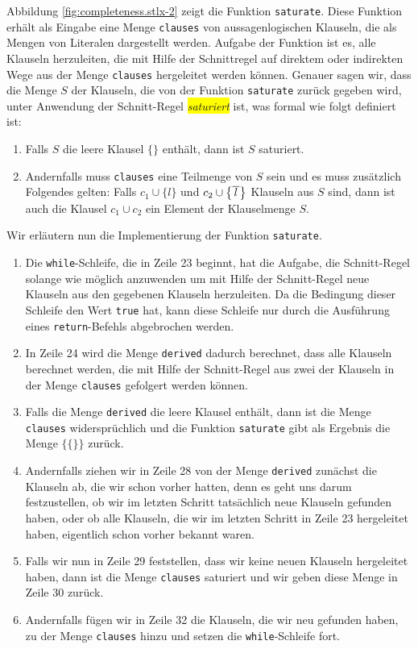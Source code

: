 Abbildung \ref{fig:completeness.stlx-2} zeigt die Funktion \texttt{saturate}.  Diese Funktion erh\"{a}lt
als Eingabe eine Menge \texttt{clauses} von aus\-sagenlogischen Klauseln, die als Mengen von Literalen
dargestellt werden.  Aufgabe der Funktion ist es, alle Klauseln herzuleiten, die mit Hilfe der
Schnittregel auf direktem oder indirekten Wege aus der Menge \texttt{clauses} hergeleitet werden
k\"{o}nnen.  Genauer sagen wir, dass die Menge $S$ der Klauseln, die von der Funktion \texttt{saturate}
zur\"{u}ck gegeben wird, unter Anwendung der Schnitt-Regel \colorbox{yellow}{\emph{saturiert}} ist, was formal wie folgt
definiert ist:
\begin{enumerate}
\item Falls $S$ die leere Klausel $\{\}$ enth\"{a}lt, dann ist $S$ saturiert.
\item Andernfalls muss \texttt{clauses} eine Teilmenge von $S$ sein und es muss zus\"{a}tzlich Folgendes
      gelten: Falls $c_1 \cup \{ l \}$ und  $c_2 \cup \bigl\{ \overline{\,l\,} \bigr\}$ Klauseln aus $S$
      sind, dann ist auch die Klausel $c_1 \cup c_2$ ein Element der Klauselmenge $S$.
\end{enumerate}
Wir erl\"{a}utern nun die Implementierung der Funktion \texttt{saturate}.
\begin{enumerate}
\item Die \texttt{while}-Schleife, die in Zeile 23 beginnt, hat die Aufgabe, die Schnitt-Regel
      solange wie m\"{o}glich anzuwenden um mit Hilfe der Schnitt-Regel neue Klauseln aus den gegebenen
      Klauseln herzuleiten.  Da die Bedingung dieser Schleife den Wert \texttt{true} hat, kann diese
      Schleife nur durch die Ausf\"{u}hrung eines \texttt{return}-Befehls abgebrochen werden.
\item In Zeile 24 wird die Menge \texttt{derived} dadurch berechnet, dass alle Klauseln berechnet
      werden, die mit Hilfe der Schnitt-Regel aus zwei der Klauseln in der Menge \texttt{clauses} 
      gefolgert werden k\"{o}nnen.
\item Falls die Menge \texttt{derived} die leere Klausel enth\"{a}lt, dann ist die Menge
      \texttt{clauses} widerspr\"{u}chlich und die Funktion \texttt{saturate} gibt als Ergebnis die
      Menge $\bigl\{ \{\} \bigr\}$ zur\"{u}ck.
\item Andernfalls ziehen wir in Zeile 28 von der Menge \texttt{derived} zun\"{a}chst die Klauseln ab, die wir schon
      vorher hatten, denn es geht uns darum festzustellen, ob wir im letzten Schritt tats\"{a}chlich
      neue Klauseln gefunden haben, oder ob alle Klauseln, die wir im letzten Schritt in Zeile 23
      hergeleitet haben, eigentlich schon vorher  bekannt  waren.
\item Falls wir nun in Zeile 29 feststellen, dass wir keine neuen Klauseln hergeleitet haben,
      dann ist die Menge \texttt{clauses} saturiert und wir geben diese Menge in Zeile 30 zur\"{u}ck.
\item Andernfalls f\"{u}gen wir in Zeile 32 die Klauseln, die wir neu gefunden haben, zu der Menge
      \texttt{clauses} hinzu und setzen die \texttt{while}-Schleife fort.
\end{enumerate}
